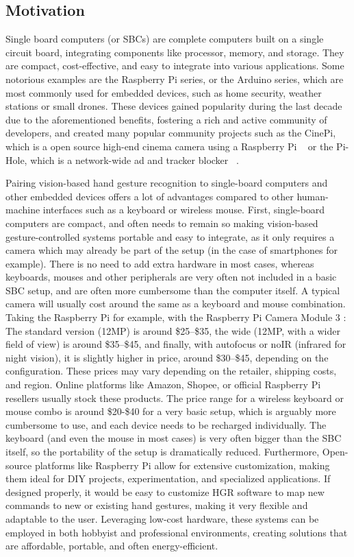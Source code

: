 \documentclass[12pt]{article}
\begin{document}
  \subsection{Motivation}

  Single board computers (or SBCs) are complete computers built on a single circuit board, integrating components like processor, memory, and storage. They are compact, cost-effective, and easy to integrate into various applications. Some notorious examples are the Raspberry Pi series, or the Arduino series, which are most commonly used for embedded devices, such as home security, weather stations or small drones.
  These devices gained popularity during the last decade due to the aforementioned benefits, fostering a rich and active community of developers, and created many popular community projects such as the CinePi, which is a open source high-end cinema camera using a Raspberry Pi ~\cite{CINEPI} or the Pi-Hole, which is a network-wide ad and tracker blocker ~\cite{PIHOLE}.

  Pairing vision-based hand gesture recognition to single-board computers and other embedded devices offers a lot of advantages compared to other human-machine interfaces such as a keyboard or wireless mouse.
  First, single-board computers are compact, and often needs to remain so making vision-based gesture-controlled systems portable and easy to integrate, as it only requires a camera which may already be part of the setup (in the case of smartphones for example). There is no need to add extra hardware in most cases, whereas keyboards, mouses and other peripherals are very often not included in a basic SBC setup, and are often more cumbersome than the computer itself.
  A typical camera will usually cost around the same as a keyboard and mouse combination. Taking the Raspberry Pi for example, with the Raspberry Pi Camera Module 3 : The standard version (12MP) is around \$25–\$35, the wide (12MP, with a wider field of view) is around \$35–\$45, and finally, with autofocus or noIR (infrared for night vision), it is slightly higher in price, around \$30–\$45, depending on the configuration. These prices may vary depending on the retailer, shipping costs, and region. Online platforms like Amazon, Shopee, or official Raspberry Pi resellers usually stock these products.
  The price range for a wireless keyboard or mouse combo is around \$20-\$40 for a very basic setup, which is arguably more cumbersome to use, and each device needs to be recharged individually. The keyboard (and even the mouse in most cases) is very often bigger than the SBC itself, so the portability of the setup is dramatically reduced.
  Furthermore, Open-source platforms like Raspberry Pi allow for extensive customization, making them ideal for DIY projects, experimentation, and specialized applications. If designed properly, it would be easy to customize HGR software to map new commands to new or existing hand gestures, making it very flexible and adaptable to the user. Leveraging low-cost hardware, these systems can be employed in both hobbyist and professional environments, creating solutions that are affordable, portable, and often energy-efficient.
\end{document}
